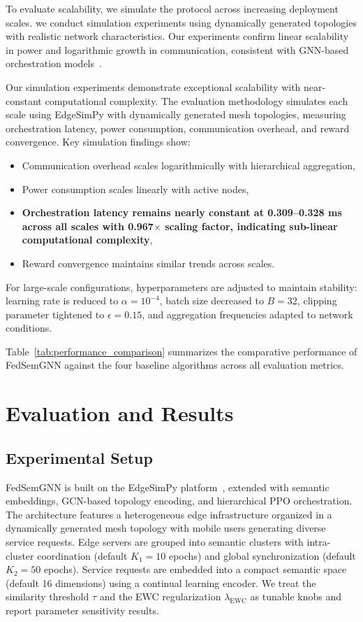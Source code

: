 \documentclass[conference]{IEEEtran}
\begin{document}
		To evaluate scalability, we simulate the protocol across increasing deployment scales. we conduct simulation experiments using dynamically generated topologies with realistic network characteristics. Our experiments confirm linear scalability in power and logarithmic growth in communication, consistent with GNN-based orchestration models~\cite{wang2024deepgrl, moreira2024vne}.
		
		Our simulation experiments demonstrate exceptional scalability with near-constant computational complexity. The evaluation methodology simulates each scale using EdgeSimPy with dynamically generated mesh topologies, measuring orchestration latency, power consumption, communication overhead, and reward convergence. Key simulation findings show:
		\begin{itemize}
			\item Communication overhead scales logarithmically with hierarchical aggregation,
			\item Power consumption scales linearly with active nodes,
			\item \textbf{Orchestration latency remains nearly constant at 0.309--0.328 ms across all scales with 0.967$\times$ scaling factor, indicating sub-linear computational complexity},
			\item Reward convergence maintains similar trends across scales.
		\end{itemize}
		
		For large-scale configurations, hyperparameters are adjusted to maintain stability: learning rate is reduced to $\alpha = 10^{-4}$, batch size decreased to $B = 32$, clipping parameter tightened to $\epsilon = 0.15$, and aggregation frequencies adapted to network conditions.
		
		Table~\ref{tab:performance_comparison} summarizes the comparative performance of FedSemGNN against the four baseline algorithms across all evaluation metrics.
		
		
		\section{Evaluation and Results}
		\label{sec:evaluation}
		
		\subsection{Experimental Setup}
		FedSemGNN is built on the EdgeSimPy platform~\cite{edgesimpy}, extended with semantic embeddings, GCN-based topology encoding, and hierarchical PPO orchestration. The architecture features a heterogeneous edge infrastructure organized in a dynamically generated mesh topology with mobile users generating diverse service requests. Edge servers are grouped into semantic clusters with intra-cluster coordination (default $K_1=10$ epochs) and global synchronization (default $K_2=50$ epochs). Service requests are embedded into a compact semantic space (default 16 dimensions) using a continual learning encoder. We treat the similarity threshold $\tau$ and the EWC regularization $\lambda_{\mathrm{EWC}}$ as tunable knobs and report parameter sensitivity results.
		
\end{document}
